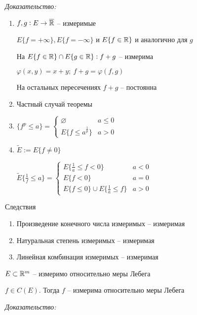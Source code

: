\documentclass[12pt]{article}
\begin{document}
\textit{Доказательство:}

\begin{enumerate}
    \item $f, g : E \to \overline{\mathbb R}$ -- измеримые 
    
    $E\{f = + \infty\}, E\{f = -\infty\}$ и $E\{f \in \mathbb R\}$ и аналогично для $g$

    На $E\{f \in \mathbb R\} \cap E\{g \in \mathbb R\} : f + g$ -- измерима 

    $\varphi(x, y) = x + y;\ f + g = \varphi(f, g)$

    На остальных пересечениях $f + g$ -- постоянна 

    \item Частный случай теоремы
    \item $\{f^p \leq a\} = \begin{cases}
        \varnothing & a \leq 0 \\
        E\{f \leq a^{\frac{1}{p}}\} & a > 0
    \end{cases}$

    \item $\tilde{E} := E\{f \neq 0\}$
    
    $\tilde{E}\{\frac{1}{f} \leq a\} = \begin{cases}
        E\{\frac{1}{a} \leq f < 0\} & a < 0 \\
        E\{f < 0\} & a = 0 \\
        E\{f \leq 0\} \cup E\{\frac{1}{a} \leq f\} & a > 0
    \end{cases}$
\end{enumerate}

\begin{theo}{Следствия}
    \begin{enumerate}
        \item Произведение конечного числа измеримых -- измеримая 
        \item Натуральная степень измеримых -- измеримая 
        \item Линейная комбинация измеримых -- измеримая 
    \end{enumerate}
\end{theo}

\begin{theo}{}
    $E \subset \mathbb R^m$ -- измеримо относительно меры Лебега

    $f \in C(E)$. Тогда $f$ -- измерима относительно меры Лебега
\end{theo}

\textit{Доказательство:}
\end{document}
